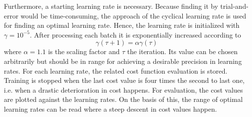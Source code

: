 Furthermore, a starting learning rate is necessary.
Because finding it by trial-and-error would be time-consuming, the approach of the cyclical learning rate is used for finding an optimal learning rate.
Hence, the learning rate is initialized with $\gamma = 10^{-5}$.
After processing each batch it is exponentially increased according to
\begin{equation}
	\gamma(\tau+1) = \alpha \gamma(\tau)
\end{equation}
where $\alpha = 1.1$ is the scaling factor and $\tau$ the iteration.
Its value can be chosen arbitrarily but should be in range for achieving a desirable precision in learning rates.
For each learning rate, the related cost function evaluation is stored.
Training is stopped when the last cost value is four times the second to last one, i.e. when a drastic deterioration in cost happens.
For evaluation, the cost values are plotted against the learning rates.
On the basis of this, the range of optimal learning rates can be read where a steep descent in cost values happen. 